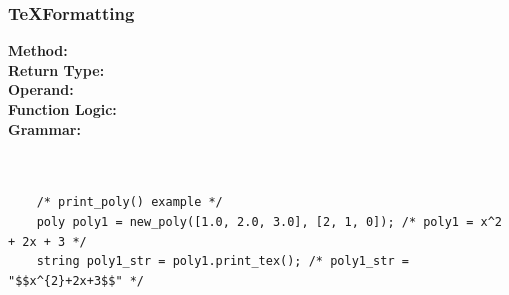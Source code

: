 \documentclass{article}
\begin{document}
\subsubsection{\TeX\text{ }Formatting}
\textbf{Method:} \\
\textbf{Return Type:}\\
    \textbf{Operand:}\\
    \textbf{Function Logic:}\\
\textbf{Grammar:}\\
    \\
    \\
    \begin{lstlisting}
    /* print_poly() example */
    poly poly1 = new_poly([1.0, 2.0, 3.0], [2, 1, 0]); /* poly1 = x^2 + 2x + 3 */
    string poly1_str = poly1.print_tex(); /* poly1_str = "$$x^{2}+2x+3$$" */
    \end{lstlisting}
\end{document}
